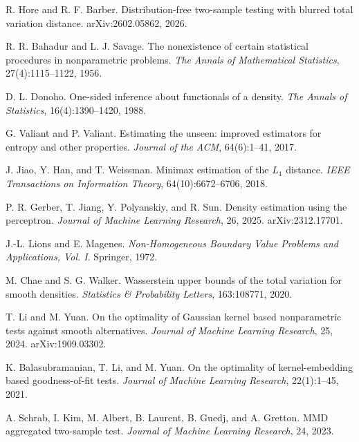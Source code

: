 R. Hore and R. F. Barber.
\newblock Distribution-free two-sample testing with blurred total variation distance.
\newblock arXiv:2602.05862, 2026.

R. R. Bahadur and L. J. Savage.
\newblock The nonexistence of certain statistical procedures in nonparametric problems.
\newblock \emph{The Annals of Mathematical Statistics}, 27(4):1115--1122, 1956.

D. L. Donoho.
\newblock One-sided inference about functionals of a density.
\newblock \emph{The Annals of Statistics}, 16(4):1390--1420, 1988.

G. Valiant and P. Valiant.
\newblock Estimating the unseen: improved estimators for entropy and other properties.
\newblock \emph{Journal of the ACM}, 64(6):1--41, 2017.

J. Jiao, Y. Han, and T. Weissman.
\newblock Minimax estimation of the $L_1$ distance.
\newblock \emph{IEEE Transactions on Information Theory}, 64(10):6672--6706, 2018.

P. R. Gerber, T. Jiang, Y. Polyanskiy, and R. Sun.
\newblock Density estimation using the perceptron.
\newblock \emph{Journal of Machine Learning Research}, 26, 2025. arXiv:2312.17701.

J.-L. Lions and E. Magenes.
\newblock \emph{Non-Homogeneous Boundary Value Problems and Applications, Vol. I}.
\newblock Springer, 1972.

M. Chae and S. G. Walker.
\newblock Wasserstein upper bounds of the total variation for smooth densities.
\newblock \emph{Statistics \& Probability Letters}, 163:108771, 2020.

T. Li and M. Yuan.
\newblock On the optimality of Gaussian kernel based nonparametric tests against smooth alternatives.
\newblock \emph{Journal of Machine Learning Research}, 25, 2024. arXiv:1909.03302.

K. Balasubramanian, T. Li, and M. Yuan.
\newblock On the optimality of kernel-embedding based goodness-of-fit tests.
\newblock \emph{Journal of Machine Learning Research}, 22(1):1--45, 2021.

A. Schrab, I. Kim, M. Albert, B. Laurent, B. Guedj, and A. Gretton.
\newblock MMD aggregated two-sample test.
\newblock \emph{Journal of Machine Learning Research}, 24, 2023.

